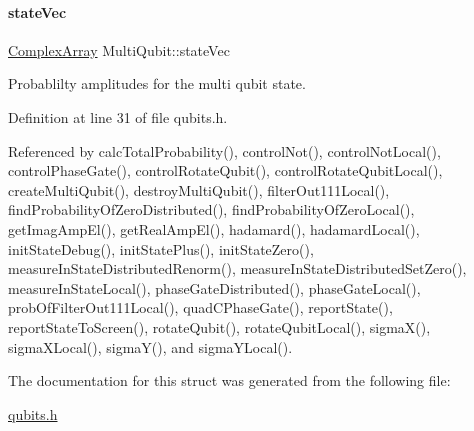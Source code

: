 \mbox{\label{structMultiQubit_a45483190d6b01ef6b2f98f2bec9ab94f}} 
\paragraph{\texorpdfstring{state\+Vec}{stateVec}}
{\footnotesize\ttfamily \hyperlink{structComplexArray}{Complex\+Array} Multi\+Qubit\+::state\+Vec}



Probablilty amplitudes for the multi qubit state. 



Definition at line 31 of file qubits.\+h.



Referenced by calc\+Total\+Probability(), control\+Not(), control\+Not\+Local(), control\+Phase\+Gate(), control\+Rotate\+Qubit(), control\+Rotate\+Qubit\+Local(), create\+Multi\+Qubit(), destroy\+Multi\+Qubit(), filter\+Out111\+Local(), find\+Probability\+Of\+Zero\+Distributed(), find\+Probability\+Of\+Zero\+Local(), get\+Imag\+Amp\+El(), get\+Real\+Amp\+El(), hadamard(), hadamard\+Local(), init\+State\+Debug(), init\+State\+Plus(), init\+State\+Zero(), measure\+In\+State\+Distributed\+Renorm(), measure\+In\+State\+Distributed\+Set\+Zero(), measure\+In\+State\+Local(), phase\+Gate\+Distributed(), phase\+Gate\+Local(), prob\+Of\+Filter\+Out111\+Local(), quad\+C\+Phase\+Gate(), report\+State(), report\+State\+To\+Screen(), rotate\+Qubit(), rotate\+Qubit\+Local(), sigma\+X(), sigma\+X\+Local(), sigma\+Y(), and sigma\+Y\+Local().



The documentation for this struct was generated from the following file\+:\begin{DoxyCompactItemize}
\item 
\hyperlink{qubits_8h}{qubits.\+h}\end{DoxyCompactItemize}
